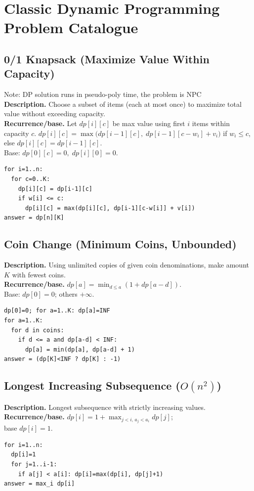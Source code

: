 \documentclass[9pt]{extarticle}
\begin{document}
\section{Classic Dynamic Programming Problem Catalogue}

\subsection{0/1 Knapsack (Maximize Value Within Capacity)}
Note: DP solution runs in pseudo-poly time, the problem is NPC\\
\textbf{Description.} Choose a subset of items (each at most once) to maximize total value without exceeding capacity.\\
\textbf{Recurrence/base.} Let \(dp[i][c]\) be max value using first \(i\) items within capacity \(c\).  
\(dp[i][c]=\max\big(dp[i-1][c],\; dp[i-1][c-w_i]+v_i\big)\) if \(w_i\le c\), else \(dp[i][c]=dp[i-1][c]\).  \\
Base: \(dp[0][c]=0,\; dp[i][0]=0\).
\begin{verbatim}
for i=1..n:
  for c=0..K:
    dp[i][c] = dp[i-1][c]
    if w[i] <= c:
      dp[i][c] = max(dp[i][c], dp[i-1][c-w[i]] + v[i])
answer = dp[n][K]
\end{verbatim}

\subsection{Coin Change (Minimum Coins, Unbounded)}
\textbf{Description.} Using unlimited copies of given coin denominations, make amount \(K\) with fewest coins.\\
\textbf{Recurrence/base.} \(dp[a]=\min_{d\le a}(1+dp[a-d])\).  \\
Base: \(dp[0]=0\); others \(+\infty\).
\begin{verbatim}
dp[0]=0; for a=1..K: dp[a]=INF
for a=1..K:
  for d in coins:
    if d <= a and dp[a-d] < INF:
      dp[a] = min(dp[a], dp[a-d] + 1)
answer = (dp[K]<INF ? dp[K] : -1)
\end{verbatim}

\subsection{Longest Increasing Subsequence ($O(n^2)$)}
\textbf{Description.} Longest subsequence with strictly increasing values.\\
\textbf{Recurrence/base.} \(dp[i]=1+\max_{j<i,\,a_j<a_i} dp[j]\); \\base \(dp[i]=1\).
\begin{verbatim}
for i=1..n:
  dp[i]=1
  for j=1..i-1:
    if a[j] < a[i]: dp[i]=max(dp[i], dp[j]+1)
answer = max_i dp[i]
\end{verbatim}
\end{document}
